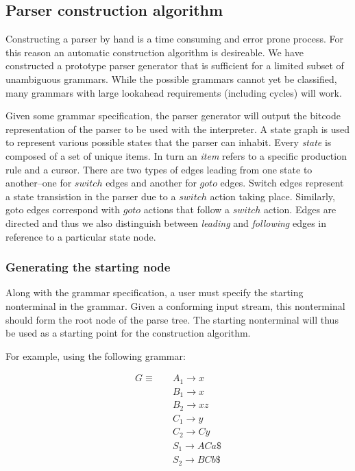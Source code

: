 \documentclass[a4paper,11pt]{article}
\begin{document}
\subsection{Parser construction algorithm}
Constructing a parser by hand is a time consuming and error prone process. For this reason an automatic construction algorithm is desireable.
We have constructed a prototype parser generator that is sufficient for a limited subset of unambiguous grammars.
While the possible grammars cannot yet be classified, many grammars with large lookahead requirements (including cycles) will work.

Given some grammar specification, the parser generator will output the bitcode representation of the parser to be used with the interpreter.
A state graph is used to represent various possible states that the parser can inhabit. 
Every \emph{state} is composed of a set of unique items.
In turn an \emph{item} refers to a specific production rule and a cursor.
There are two types of edges leading from one state to another--one for $switch$ edges and another for $goto$ edges.
Switch edges represent a state transistion in the parser due to a $switch$ action taking place. 
Similarly, goto edges correspond with $goto$ actions that follow a $switch$ action.
Edges are directed and thus we also distinguish between \emph{leading} and \emph{following} edges in reference to a particular state node.\\

\subsubsection{Generating the starting node}
Along with the grammar specification, a user must specify the starting nonterminal in the grammar. Given a conforming input stream, this nonterminal should form the root node of the parse tree.
The starting nonterminal will thus be used as a starting point for the construction algorithm.
 
For example, using the following grammar:

\parbox{.3\textwidth}{\begin{align*}
G \equiv \quad & A_1 \rightarrow x\\
               & B_1 \rightarrow x\\
               & B_2 \rightarrow x z\\
               & C_1 \rightarrow y\\
               & C_2 \rightarrow C y\\
               & S_1 \rightarrow A C a \$\\
               & S_2 \rightarrow B C b \$
\end{align*}}
\end{document}
